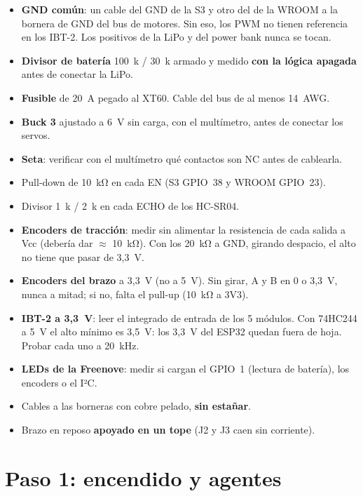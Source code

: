 \begin{itemize}[label=$\square$]
  \item \textbf{GND común}: un cable del GND de la S3 y otro del de la WROOM a la bornera de GND del bus de motores.
        Sin eso, los PWM no tienen referencia en los IBT-2. Los positivos de la LiPo y del power bank nunca se tocan.
  \item \textbf{Divisor de batería} 100~k / 30~k armado y medido \textbf{con la lógica apagada} antes de conectar la LiPo.
  \item \textbf{Fusible} de 20~A pegado al XT60. Cable del bus de al menos 14~AWG.
  \item \textbf{Buck 3} ajustado a 6~V sin carga, con el multímetro, antes de conectar los servos.
  \item \textbf{Seta}: verificar con el multímetro qué contactos son NC antes de cablearla.
  \item Pull-down de 10~kΩ en cada EN (S3 GPIO~38 y WROOM GPIO~23).
  \item Divisor 1~k / 2~k en cada ECHO de los HC-SR04.
  \item \textbf{Encoders de tracción}: medir sin alimentar la resistencia de cada salida a Vcc (debería dar $\approx$
        10~kΩ). Con los 20~kΩ a GND, girando despacio, el alto no tiene que pasar de 3,3~V.
  \item \textbf{Encoders del brazo} a 3,3~V (no a 5~V). Sin girar, A y B en 0 o 3,3~V, nunca a mitad; si no, falta el
        pull-up (10~kΩ a 3V3).
  \item \textbf{IBT-2 a 3,3~V}: leer el integrado de entrada de los 5 módulos. Con 74HC244 a 5~V el alto mínimo es
        3,5~V: los 3,3~V del ESP32 quedan fuera de hoja. Probar cada uno a 20~kHz.
  \item \textbf{LEDs de la Freenove}: medir si cargan el GPIO~1 (lectura de batería), los encoders o el I²C.
  \item Cables a las borneras con cobre pelado, \textbf{sin estañar}.
  \item Brazo en reposo \textbf{apoyado en un tope} (J2 y J3 caen sin corriente).
\end{itemize}

\section{Paso 1: encendido y agentes}

